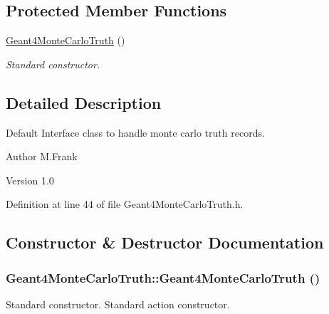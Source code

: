 \subsection*{Protected Member Functions}
\begin{DoxyCompactItemize}
\item 
\hyperlink{class_d_d4hep_1_1_simulation_1_1_geant4_monte_carlo_truth_a2b9a9965ca3752b2f4e1a9e267f3c4cc}{Geant4MonteCarloTruth} ()
\begin{DoxyCompactList}\small\item\em Standard constructor. \item\end{DoxyCompactList}\end{DoxyCompactItemize}


\subsection{Detailed Description}
Default Interface class to handle monte carlo truth records. \begin{DoxyAuthor}{Author}
M.Frank 
\end{DoxyAuthor}
\begin{DoxyVersion}{Version}
1.0 
\end{DoxyVersion}


Definition at line 44 of file Geant4MonteCarloTruth.h.

\subsection{Constructor \& Destructor Documentation}
\hypertarget{class_d_d4hep_1_1_simulation_1_1_geant4_monte_carlo_truth_a2b9a9965ca3752b2f4e1a9e267f3c4cc}{
\subsubsection[{Geant4MonteCarloTruth}]{\setlength{\rightskip}{0pt plus 5cm}Geant4MonteCarloTruth::Geant4MonteCarloTruth ()}}
\label{class_d_d4hep_1_1_simulation_1_1_geant4_monte_carlo_truth_a2b9a9965ca3752b2f4e1a9e267f3c4cc}


Standard constructor. Standard action constructor. 

